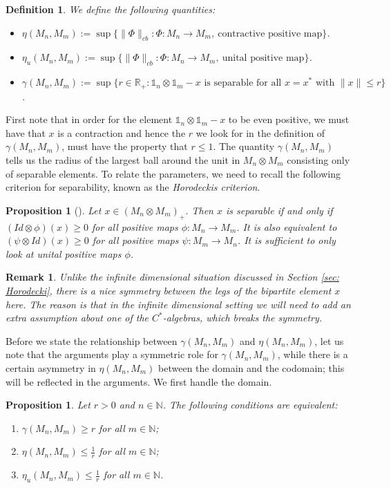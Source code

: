 \documentclass[11pt]{article}
\numberwithin{theorem}{section}
\newtheorem{definition}[theorem]{Definition}
\newtheorem{prop}[theorem]{Proposition}
\newtheorem{remark}[theorem]{Remark}
\begin{document}
\begin{definition}\label{def:etaandgamma}
We define the following quantities:
\begin{itemize}
    \item $\eta(M_n, M_m) :=\sup\{\|\Phi\|_{cb}: \Phi: M_n\rightarrow M_m,  \ \text{contractive positive map}\}$.
\item  $\eta_{u}(M_n, M_m) :=\sup\{\|\Phi\|_{cb}: \Phi: M_n\rightarrow M_m,  \ \text{unital positive map}\}$.
\item $\gamma(M_{n}, M_{m}) := \sup\{r \in \mathbb{R}_{+}: \mathds{1}_n \otimes \mathds{1}_m - x \text{ is separable for all } x=x^{\ast}\text{ with }\|x\|\leqslant r\}$.
\end{itemize}
\end{definition}
First note that in order for the element $ \mathds{1}_n \otimes \mathds{1}_m - x$ to be even positive, we must have that $x$ is a contraction and hence the $r$ we look for in the definition of $\gamma(M_{n}, M_{m})$, must have the property that $r\leq 1$. 
The quantity $\gamma(M_n, M_m)$ tells us the radius of the largest ball around the unit in $M_n \otimes M_m$ consisting only of separable elements. To relate the parameters, we need to recall the following criterion for separability, known as the \emph{Horodeckis criterion}.
\begin{prop}[\cite{MR1421501}]\label{prop:Horodeckicrit}
Let $x \in (M_{n} \otimes M_{m})_{+}$. Then $x$ is separable if and only if $(Id\otimes \phi)(x) \geqslant 0$ for all positive maps $\phi: M_{n} \to M_{m}$. It is also equivalent to $(\psi \otimes Id)(x) \geqslant 0$ for all positive maps $\psi: M_{m} \to M_{n}$. It is sufficient to only look at unital positive maps $\phi$.
\end{prop}
\begin{remark}
Unlike the infinite dimensional situation discussed in Section \ref{sec: Horodecki}, there is a nice symmetry between the legs of the bipartite element $x$ here. The reason is that in the infinite dimensional setting we will need to add an extra assumption about one of the $C^{\ast}$-algebras, which breaks the symmetry.
\end{remark}
Before we state the relationship between $\gamma(M_{n}, M_{m})$ and $\eta(M_{n}, M_{m})$, let us note that the arguments play a symmetric role for $\gamma(M_{n}, M_{m})$, while there is a certain asymmetry in $\eta(M_{n}, M_{m})$ between the domain and the codomain; this will be reflected in the arguments. We first handle the domain.
\begin{prop}\label{prop:onesidedsepvscb}
Let $r>0$ and $n\in \mathbb{N}$. The following conditions are equivalent:
\begin{enumerate}[{\normalfont (i)}]
\item\label{item:one} $\gamma(M_n, M_{m}) \geqslant r$ for all $m\in \mathbb{N}$;
\item\label{item:two} $\eta(M_{n}, M_{m}) \leqslant \frac{1}{r}$ for all $m\in \mathbb{N}$;
\item\label{item:three} $\eta_{u}(M_{n}, M_{m}) \leqslant \frac{1}{r}$ for all $m \in \mathbb{N}$.
\end{enumerate}
\end{prop}
\end{document}
